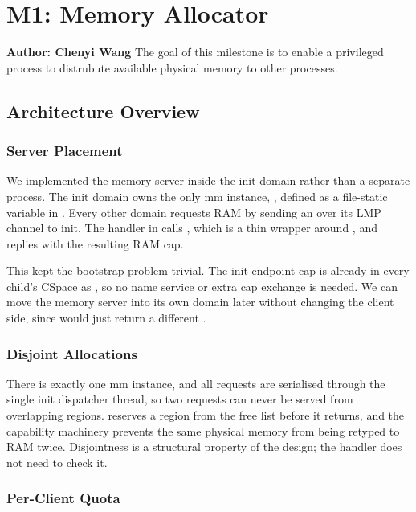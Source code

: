 \chapter*{M1: Memory Allocator}{\textbf{Author: Chenyi Wang}
\newline
 \newline
 The goal of this milestone is to enable a privileged process to distrubute available
 physical memory to other processes.}
\section{Architecture Overview}
\subsection{Server Placement}

We implemented the memory server inside the init domain rather than a separate
process. The init domain owns the only mm instance, , defined as a
file-static variable in . Every other domain requests
RAM by sending an  over its LMP channel to init. The
handler  in  calls
, which is a thin wrapper around ,
and replies with the resulting RAM cap.

\medskip\noindent
This kept the bootstrap problem trivial. The init endpoint cap is already in
every child's CSpace as , so no name service or extra cap exchange
is needed. We can move the memory server into its own domain later without
changing the client side, since  would just
return a different .

\subsection{Disjoint Allocations}

There is exactly one mm instance, and all requests are serialised through the
single init dispatcher thread, so two requests can never be served from
overlapping regions.  reserves a region from the free list
before it returns, and the capability machinery prevents the same physical
memory from being retyped to RAM twice. Disjointness is a structural property
of the design; the handler does not need to check it.

\subsection{Per-Client Quota}

